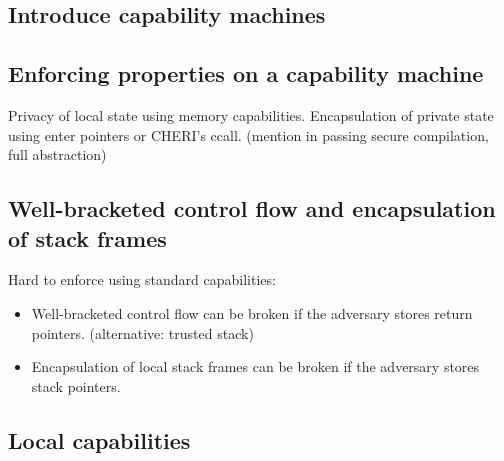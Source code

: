 \documentclass[compsoc,conference,letterpaper,fleqn]{IEEEtran}
\begin{document}



% 

\subsection{Introduce capability machines}
\subsection{Enforcing properties on a capability machine}

Privacy of local state using memory capabilities.
Encapsulation of private state using enter pointers or CHERI's ccall.
(mention in passing secure compilation, full abstraction)

\subsection{Well-bracketed control flow and encapsulation of stack frames}

Hard to enforce using standard capabilities:
\begin{itemize}
\item Well-bracketed control flow can be broken if the adversary stores return pointers.
(alternative: trusted stack)
\item Encapsulation of local stack frames can be broken if the adversary stores stack pointers.
\end{itemize}

\subsection{Local capabilities}
\end{document}

